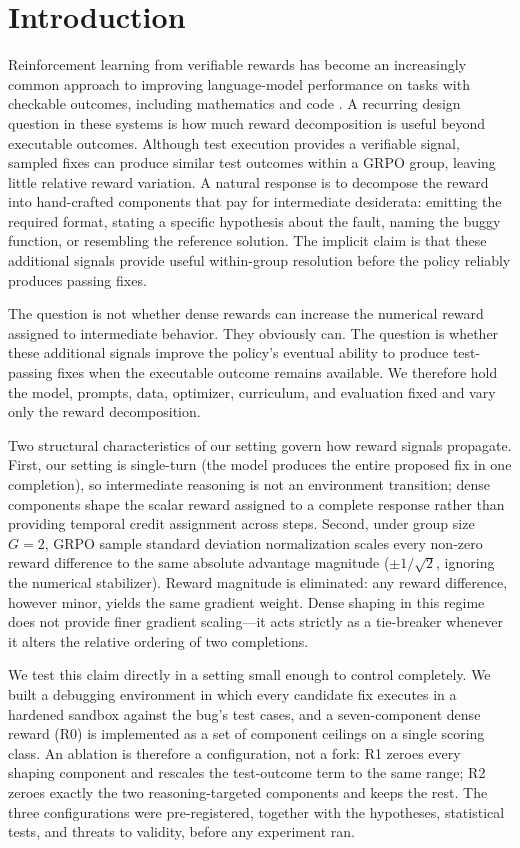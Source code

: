 \documentclass{article}
\begin{document}
\begin{abstract}
\end{abstract}

\section{Introduction}
Reinforcement learning from verifiable rewards has become an increasingly common approach to improving language-model performance on tasks with checkable outcomes, including mathematics and code \cite{Shao2024, Guo2025}. A recurring design question in these systems is how much reward decomposition is useful beyond executable outcomes. Although test execution provides a verifiable signal, sampled fixes can produce similar test outcomes within a GRPO group, leaving little relative reward variation. A natural response is to decompose the reward into hand-crafted components that pay for intermediate desiderata: emitting the required format, stating a specific hypothesis about the fault, naming the buggy function, or resembling the reference solution. The implicit claim is that these additional signals provide useful within-group resolution before the policy reliably produces passing fixes.

The question is not whether dense rewards can increase the numerical reward assigned to intermediate behavior. They obviously can. The question is whether these additional signals improve the policy's eventual ability to produce test-passing fixes when the executable outcome remains available. We therefore hold the model, prompts, data, optimizer, curriculum, and evaluation fixed and vary only the reward decomposition. 

Two structural characteristics of our setting govern how reward signals propagate. First, our setting is single-turn (the model produces the entire proposed fix in one completion), so intermediate reasoning is not an environment transition; dense components shape the scalar reward assigned to a complete response rather than providing temporal credit assignment across steps. Second, under group size $G=2$, GRPO sample standard deviation normalization scales every non-zero reward difference to the same absolute advantage magnitude ($\pm 1/\sqrt{2}$, ignoring the numerical stabilizer). Reward magnitude is eliminated: any reward difference, however minor, yields the same gradient weight. Dense shaping in this regime does not provide finer gradient scaling—it acts strictly as a tie-breaker whenever it alters the relative ordering of two completions.

We test this claim directly in a setting small enough to control completely. We built a debugging environment in which every candidate fix executes in a hardened sandbox against the bug's test cases, and a seven-component dense reward (R0) is implemented as a set of component ceilings on a single scoring class. An ablation is therefore a configuration, not a fork: R1 zeroes every shaping component and rescales the test-outcome term to the same range; R2 zeroes exactly the two reasoning-targeted components and keeps the rest. The three configurations were pre-registered, together with the hypotheses, statistical tests, and threats to validity, before any experiment ran.
\end{document}
